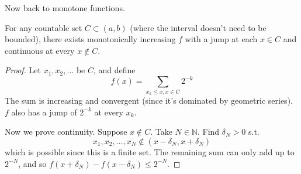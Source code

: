   Now back to monotone functions. 

  \begin{theorem}
    For any countable set $C \subset (a, b)$ (where the interval doesn't need to be bounded), there exists monotonically increasing $f$ with a jump at each $x \in C$ and continuous at every $x \not\in C$. 
  \end{theorem}
  \begin{proof}
    Let $x_1, x_2, \ldots$ be $C$, and define 
    \begin{equation}
      f(x) = \sum_{x_k \leq x, x \in C} 2^{-k}
    \end{equation}
    The sum is increasing and convergent (since it's dominated by geometric series). $f$ also has a jump of $2^{-k}$ at every $x_k$. 

    Now we prove continuity. Suppose $x \not\in C$. Take $N \in \mathbb{N}$. Find $\delta_N > 0$ s.t. 
    \begin{equation}
      x_1, x_2, \ldots, x_N \not\in (x - \delta_N, x + \delta_N)
    \end{equation}
    which is possible since this is a finite set. The remaining sum can only add up to $2^{-N}$, and so $f(x + \delta_N) - f(x - \delta_N) \leq 2^{-N}$. 
  \end{proof}



